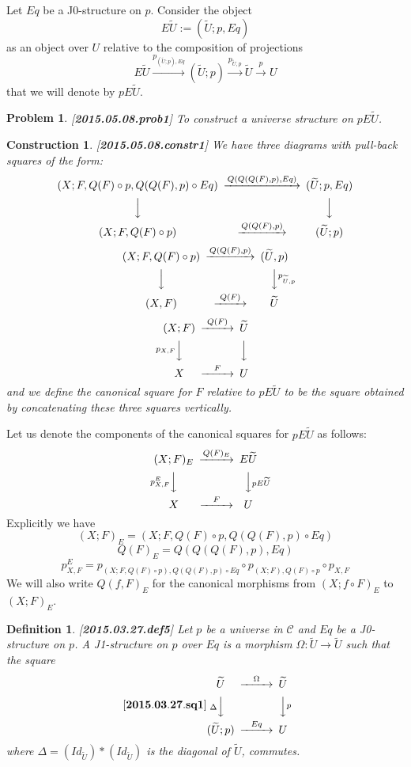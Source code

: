 \documentclass[12pt]{article}
\newenvironment{eq}{\begin{equation}}{\end{equation}}
\newtheorem{definition}[proposition]{Definition}
\newtheorem{problem}[proposition]{Problem}
\newtheorem{construction}[proposition]{Construction}
\newcommand{\llabel}[1]{\label{#1}[{\bf #1}]}
\newcommand{\sr}{\rightarrow}
\newcommand{\lr}{\longrightarrow}
\newcommand{\wt}{\widetilde}
\begin{document}
Let $Eq$ be a J0-structure on $p$. Consider the object 
%
$$E\wt{U}:=(\wt{U};p,Eq)$$
%
as an object over $U$ relative to the composition of projections 
%
$$E\wt{U}\stackrel{p_{(\wt{U};p),Eq}}{\lr}(\wt{U};p)\stackrel{p_{\wt{U},p}}{\lr} \wt{U}\stackrel{p}{\sr} U$$
%
that we will denote by $pE\wt{U}$. 
%
\begin{problem}
\llabel{2015.05.08.prob1}
To construct a universe structure on $pE\wt{U}$.
\end{problem}
%
\begin{construction}\rm
\llabel{2015.05.08.constr1}
We have three diagrams with pull-back squares of the form:
%
$$
%
\begin{CD}
(X;F,Q(F)\circ p, Q(Q(F),p)\circ Eq) @>Q(Q(Q(F),p),Eq)>> (\wt{U}; p, Eq)\\
@VVV @VVV\\
(X;F,Q(F)\circ p) @>Q(Q(F),p)>> (\wt{U};p)
\end{CD}
$$$$
\begin{CD}
(X;F,Q(F)\circ p) @>Q(Q(F),p)>> (\wt{U},p)\\
@VVV @VVp_{\wt{U},p}V\\
(X,F) @>Q(F)>> \wt{U}
\end{CD}
$$$$
\begin{CD}
(X;F) @>Q(F)>> \wt{U}\\
@Vp_{X,F} VV @VVV\\
X @>F>> U
\end{CD}
%
$$
%
and we define the canonical square for $F$ relative to $pE\wt{U}$ to be the square obtained by concatenating these three squares vertically. 
\end{construction}
%
Let us denote the components of the canonical squares for $pE\wt{U}$ as follows:
%
$$
\begin{CD}
(X;F)_{E} @>Q(F)_{E}>> E\wt{U}\\
@Vp_{X,F}^{E} VV @VVpE\wt{U} V\\
X @>F>> U
\end{CD}
$$
%
Explicitly we have
%
$$(X;F)_{E}=(X;F,Q(F)\circ p, Q(Q(F),p)\circ Eq)$$
$$Q(F)_{E}=Q(Q(Q(F),p),Eq)$$
$$p_{X,F}^E=p_{(X;F,Q(F)\circ p),Q(Q(F),p)\circ Eq}\circ p_{(X;F),Q(F)\circ p}\circ p_{X,F}$$
%
We will also write $Q(f,F)_{E}$ for the canonical morphisms from $(X;f\circ F)_{E}$ to $(X;F)_{E}$. 
%
\begin{definition}
\llabel{2015.03.27.def5}
Let $p$ be a universe in $\mathcal C$ and $Eq$ be a J0-structure on $p$. A J1-structure on $p$ over $Eq$ is a morphism $\Omega:\wt{U}\sr \wt{U}$ such that the square
%
\begin{eq}\llabel{2015.03.27.sq1}
\begin{CD}
\wt{U} @>\Omega>> \wt{U}\\
@V\Delta VV @VVp V\\
(\wt{U};p) @>Eq >> U
\end{CD}
\end{eq}
%
where $\Delta=(Id_{\wt{U}})*(Id_{\wt{U}})$ is the diagonal of $\wt{U}$, commutes.
\end{definition}
%
\end{document}
